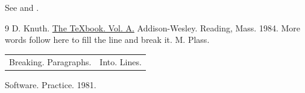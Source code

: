 \documentclass{article}
\begin{document}
See \cite{a} and \cite{b}.
\begin{thebibliography}{9}
 D. Knuth. \underline{The TeXbook. Vol. A.} Addison-Wesley. Reading, Mass. 1984. More words follow here to fill
the line and break it.
 M. Plass. \begin{tabular}{l@{. }r} Breaking. Paragraphs. & Into. Lines. \end{tabular} Software. Practice. 1981.
\end{thebibliography}
\end{document}
